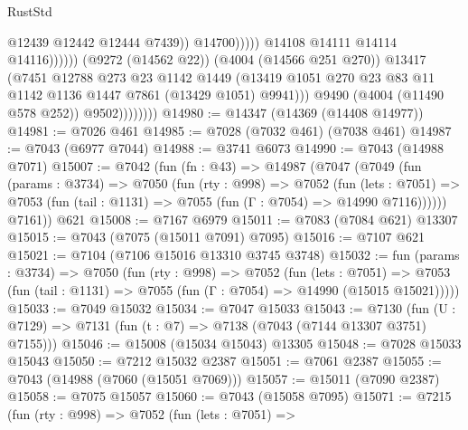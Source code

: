 \begin{lexlean}{RustStd}
\begin{coremodule}
                                                @12439
                                                @12442
                                                @12444
                                                @7439))
                                            @14700)))))
                                  @14108
                                  @14111
                                  @14114
                                  @14116))))))
                      (@9272 (@14562 @22))
                      (@4004 (@14566 @251 @270))
                      @13417
                      (@7451
                        @12788
                        @273
                        @23
                        @1142
                        @1449
                        (@13419
                          @1051
                          @270
                          @23
                          @83
                          @11
                          @1142
                          @1136
                          @1447
                          @7861
                          (@13429 @1051)
                          @9941)))
                    @9490
                    (@4004 (@11490 @578 @252))
                    @9502))))))))
@14980 := @14347 (@14369 (@14408 @14977))
@14981 := @7026 @461
@14985 := @7028 (@7032 @461) (@7038 @461)
@14987 := @7043 (@6977 @7044)
@14988 := @3741 @6073
@14990 := @7043 (@14988 @7071)
@15007 := @7042
    (fun (fn : @43) =>
    @14987
      (@7047
        (@7049
          (fun (params : @3734) =>
          @7050
            (fun (rty : @998) =>
            @7052
              (fun (lets : @7051) =>
              @7053 (fun (tail : @1131) => @7055 (fun (Γ : @7054) => @14990 @7116))))))
        @7161))
    @621
@15008 := @7167 @6979
@15011 := @7083 (@7084 @621) @13307
@15015 := @7043 (@7075 (@15011 @7091) @7095)
@15016 := @7107 @621
@15021 := @7104 (@7106 @15016 @13310 @3745 @3748)
@15032 := fun (params : @3734) =>
  @7050
    (fun (rty : @998) =>
    @7052
      (fun (lets : @7051) =>
      @7053 (fun (tail : @1131) => @7055 (fun (Γ : @7054) => @14990 (@15015 @15021)))))
@15033 := @7049 @15032
@15034 := @7047 @15033
@15043 := @7130
    (fun (U : @7129) => @7131 (fun (t : @7) => @7138 (@7043 (@7144 @13307 @3751) @7155)))
@15046 := @15008 (@15034 @15043) @13305
@15048 := @7028 @15033 @15043
@15050 := @7212 @15032 @2387
@15051 := @7061 @2387
@15055 := @7043 (@14988 (@7060 (@15051 @7069)))
@15057 := @15011 (@7090 @2387)
@15058 := @7075 @15057
@15060 := @7043 (@15058 @7095)
@15071 := @7215
    (fun (rty : @998) =>
    @7052
      (fun (lets : @7051) =>

\end{coremodule}
\end{lexlean}
